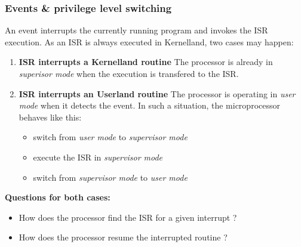 %
%
%

\begin{frame}
  \frametitle{Events \& privilege level switching}

  An event interrupts the currently running program and invokes the ISR
  execution. As an ISR is always executed in Kernelland, two cases may happen:

  \begin{enumerate}
    \item {\bf ISR interrupts a Kernelland routine}
    The processor is already in {\em superisor mode} when the execution is
    transfered to the ISR.

    \item {\bf ISR interrupts an Userland routine}
    The processor is operating in {\em user mode} when it detects the event.
    In such a situation, the microprocessor behaves like this:

    \begin{itemize}
      \item switch from {\em user mode} to {\em supervisor mode}
      \item execute the ISR in {\em supervisor mode}
      \item switch from {\em supervisor mode} to {\em user mode}
    \end{itemize}

  \end{enumerate}

  \-

  {\bf Questions for both cases:}

  \begin{itemize}
    \item How does the processor find the ISR for a given interrupt ?
    \item How does the processor resume the interrupted routine ?
  \end{itemize}

\end{frame}

%
%
%


